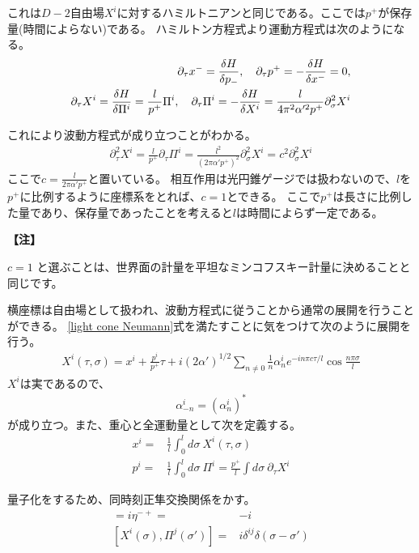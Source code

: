 \documentclass[11pt, dvipdfmx]{article}
\numberwithin{equation}{section}
\newcommand{\blankline}{\par\vspace{\baselineskip}} %
\newenvironment{note}{
    \vspace{1ex} %
    \par\footnotesize\noindent\textbf{【注】}
}{
    \par\vspace{1ex} %
}
\begin{document}
これは$D-2$自由場$X^i$に対するハミルトニアンと同じである。ここでは$p^+$が保存量(時間によらない)である。
ハミルトン方程式より運動方程式は次のようになる。
\begin{align}
    \partial_\tau x^-=\frac{\delta H}{\delta p_-}, \quad\partial_\tau p^+ = -\frac{\delta H}{\delta x^-}=0, \notag\\
    \partial_\tau X^i = \frac{\delta H}{\delta \Pi^i} = \frac{l}{ p^+} \Pi^i, \quad
    \partial_\tau \Pi^i = -\frac{\delta H}{\delta X^i} = \frac{l}{4\pi^2\alpha'^2 p^+} \partial_\sigma^2 X^i
\end{align}

これにより波動方程式が成り立つことがわかる。
\begin{align}
    \partial_\tau^2 X^i=\frac{l}{p^+}\partial_\tau \Pi^i =  \frac{l^2}{(2\pi\alpha' p^+)^2} \partial_\sigma^2 X^i=c^2\partial_\sigma^2 X^i
\end{align}
ここで$c=\frac{l}{2\pi\alpha' p^+}$と置いている。
相互作用は光円錐ゲージでは扱わないので、$l$を$p^+$に比例するように座標系をとれば、$c=1$とできる。
ここで$p^+$は長さに比例した量であり、保存量であったことを考えると$l$は時間によらず一定である。
\begin{note}
    $c = 1$ と選ぶことは、世界面の計量を平坦なミンコフスキー計量に決めることと同じです。
\end{note}
横座標は自由場として扱われ、波動方程式に従うことから通常の展開を行うことができる。
\eqref{light cone Neumann}式を満たすことに気をつけて次のように展開を行う。
\begin{align}
    X^i(\tau,\sigma) = x^i +\frac{p^i}{p^+}\tau +i(2\alpha')^{1/2} \sum_{n\neq 0} \frac{1}{n} \alpha_n^i e^{-in\pi c \tau/l} \cos\frac{n\pi\sigma}{l}\label{fourie expansion}
\end{align}
$X^i$は実であるので、
\begin{align}
    \alpha_{-n}^i = (\alpha_n^i)^*
\end{align}
が成り立つ。また、重心と全運動量として次を定義する。
\begin{align}
    x^i=&\frac{1}{l}\int_0^ld \sigma \ X^i(\tau,\sigma)\\
    p^i=&\frac{1}{l}\int_0^ld \sigma \ \Pi^i=\frac{p^+}{l}\int d\sigma \ \partial_\tau X^i
\end{align}
\blankline
量子化をするため、同時刻正隼交換関係をかす。
\begin{align}
    [x^-,p^+]=i\eta^{-+}=&-i\\
    [X^i(\sigma),\Pi^j(\sigma')]=&i\delta^{ij}\delta(\sigma-\sigma')
\end{align}
\end{document}
